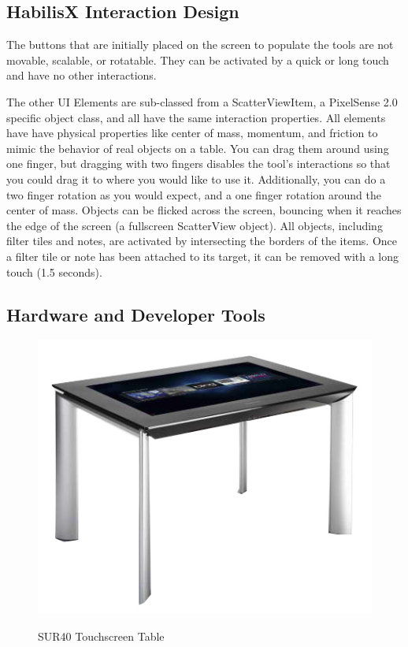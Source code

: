 \documentclass{article}
\begin{document}
\subsection{HabilisX Interaction Design}
The buttons that are initially placed on the screen to populate the tools are not movable, scalable, or rotatable.  They can be activated by a quick or long touch and have no other interactions.  

The other UI Elements are sub-classed from a ScatterViewItem, a PixelSense 2.0 specific object class, and all have the same interaction properties.  All elements have have physical properties like center of mass, momentum, and friction to mimic the behavior of real objects on a table.  You can drag them around using one finger, but dragging with two fingers  disables the tool's interactions so that you could drag it to where you would like to use it.  Additionally, you can do a two finger rotation as you would expect, and a one finger rotation around the center of mass.  Objects can be flicked across the screen, bouncing when it reaches the edge of the screen (a fullscreen ScatterView object).  All objects, including filter tiles and notes, are activated by intersecting the borders of the items.  Once a filter tile or note has been attached to its target, it can be removed with a long touch (1.5 seconds).  

\subsection{Hardware and Developer Tools}

\begin{figure}[t!]
\centering
\scalebox{1}
{\includegraphics{SUR40.jpg}}
\caption{SUR40 Touchscreen Table}
\label{Fig:table}
\end{figure}
\end{document}
